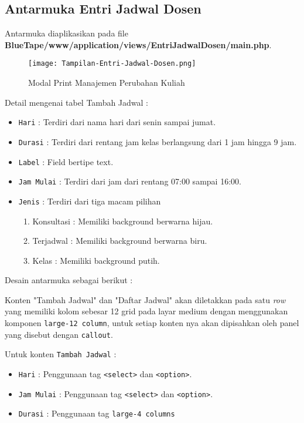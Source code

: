 \subsection{Antarmuka Entri Jadwal Dosen}
Antarmuka diaplikasikan pada file \textbf{BlueTape/www/application/views/EntriJadwalDosen/main.php}.
\begin{figure} [H]
	\centering  
	\texttt{[image: Tampilan-Entri-Jadwal-Dosen.png]}  
	\caption{Modal Print Manajemen Perubahan Kuliah} 
\end{figure}

Detail mengenai tabel Tambah Jadwal :
\begin{itemize}
	\item \texttt{Hari} : Terdiri dari nama hari dari senin sampai jumat.
	\item \texttt{Durasi} : Terdiri dari rentang jam kelas berlangsung dari 1 jam hingga 9 jam.
	\item \texttt{Label} : Field bertipe text.
	\item \texttt{Jam Mulai} : Terdiri dari jam dari rentang 07:00 sampai 16:00.
	\item \texttt{Jenis} : Terdiri dari tiga macam pilihan 
	\begin{enumerate}
		\item Konsultasi : Memiliki background berwarna hijau.
		\item Terjadwal : Memiliki background berwarna biru.
		\item Kelas : Memiliki background putih.
	\end{enumerate}
\end{itemize}

Desain antarmuka sebagai berikut : \par
Konten "Tambah Jadwal" dan "Daftar Jadwal" akan diletakkan pada satu \textit{row} yang memiliki kolom sebesar 12 grid pada layar medium dengan menggunakan komponen \colorbox{mygray}{\texttt{large-12 column}}, untuk setiap konten nya akan dipisahkan oleh panel yang disebut dengan \colorbox{mygray}{\texttt{callout}}. \par
Untuk konten \texttt{Tambah Jadwal} :
\begin{itemize}
	\item \texttt{Hari} : Penggunaan tag \colorbox{mygray}{\texttt{<select>}} dan \colorbox{mygray}{\texttt{<option>}}.
	\item \texttt{Jam Mulai} : Penggunaan tag \colorbox{mygray}{\texttt{<select>}} dan \texttt{<option>}.
	\item \texttt{Durasi} : Penggunaan tag \colorbox{mygray}{\texttt{large-4 columns}}
\end{itemize}


